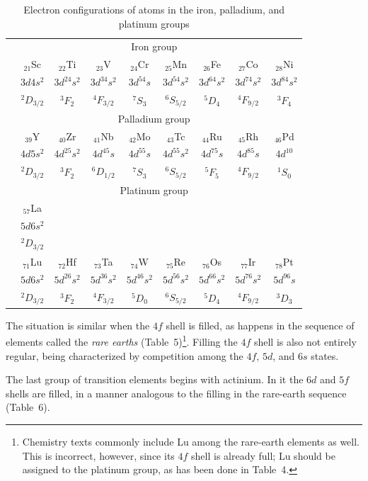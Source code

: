 \begin{table}[ht]
\centering\scriptsize
\caption{Electron configurations of atoms in the iron, palladium, and platinum groups}
\begin{tabular}{c|cccccccc}
\multicolumn{9}{c}{Iron group}\\
&$_{21}$Sc&$_{22}$Ti&$_{23}$V&$_{24}$Cr&$_{25}$Mn&$_{26}$Fe&$_{27}$Co&$_{28}$Ni\\
&$3d4s^2$&$3d^24s^2$&$3d^34s^2$&$3d^54s$&$3d^54s^2$&$3d^64s^2$&$3d^74s^2$&$3d^84s^2$\\
&$^2D_{3/2}$&$^3F_2$&$^4F_{3/2}$&$^7S_3$&$^6S_{5/2}$&$^5D_4$&$^4F_{9/2}$&$^3F_4$\\\hline
\multicolumn{9}{c}{Palladium group}\\
&$_{39}$Y&$_{40}$Zr&$_{41}$Nb&$_{42}$Mo&$_{43}$Tc&$_{44}$Ru&$_{45}$Rh&$_{46}$Pd\\
&$4d5s^2$&$4d^25s^2$&$4d^45s$&$4d^55s$&$4d^55s^2$&$4d^75s$&$4d^85s$&$4d^{10}$\\
&$^2D_{3/2}$&$^3F_2$&$^6D_{1/2}$&$^7S_3$&$^6S_{5/2}$&$^5F_5$&$^4F_{9/2}$&$^1S_0$\\\hline
\multicolumn{9}{c}{Platinum group}\\
&$_{57}$La&&&&&&&\\
&$5d6s^2$&&&&&&&\\
&$^2D_{3/2}$&&&&&&&\\
&$_{71}$Lu&$_{72}$Hf&$_{73}$Ta&$_{74}$W&$_{75}$Re&$_{76}$Os&$_{77}$Ir&$_{78}$Pt\\
&$5d6s^2$&$5d^26s^2$&$5d^36s^2$&$5d^46s^2$&$5d^56s^2$&$5d^66s^2$&$5d^76s^2$&$5d^96s$\\
&$^2D_{3/2}$&$^3F_2$&$^4F_{3/2}$&$^5D_0$&$^6S_{5/2}$&$^5D_4$&$^4F_{9/2}$&$^3D_3$
\end{tabular}
\end{table}

The situation is similar when the $4f$ shell is filled, as happens in the sequence of elements called the \emph{rare earths} (Table~5)\footnote{Chemistry texts commonly include Lu among the rare-earth elements as well. This is incorrect, however, since its $4f$ shell is already full; Lu should be assigned to the platinum group, as has been done in Table~4.}. Filling the $4f$ shell is also not entirely regular, being characterized by competition among the $4f$, $5d$, and $6s$ states.

The last group of transition elements begins with actinium. In it the $6d$ and $5f$ shells are filled, in a manner analogous to the filling in the rare-earth sequence (Table~6).

